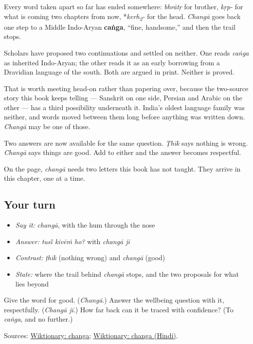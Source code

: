 \begin{cousinweb}
Every word taken apart so far has ended somewhere: \emph{bhrātṛ} for brother, \emph{kṛp-} for what is coming two chapters from now, *\emph{kerh\textsubscript{2}-} for the head. \emph{Changā} goes back one step to a Middle Indo-Aryan \textbf{caṅga}, \textquotedblleft{}fine, handsome,\textquotedblright{} and then the trail stops.

Scholars have proposed two continuations and settled on neither. One reads \emph{caṅga} as inherited Indo-Aryan; the other reads it as an early borrowing from a Dravidian language of the south. Both are argued in print. Neither is proved.

That is worth meeting head-on rather than papering over, because the two-source story this book keeps telling — Sanskrit on one side, Persian and Arabic on the other — has a third possibility underneath it. India's oldest language family was neither, and words moved between them long before anything was written down. \emph{Changā} may be one of those.

Two answers are now available for the same question. \emph{Ṭhīk} says nothing is wrong. \emph{Changā} says things are good. Add \textbf{} to either and the answer becomes respectful.

On the page, \emph{changā} needs two letters this book has not taught. They arrive in this chapter, one at a time.
\end{cousinweb}

\subsection*{Your turn}
\begin{itemize}
\raggedright
  \item \emph{Say it:} \emph{changā}, with the hum through the nose
  \item \emph{Answer:} \emph{tusī̃ kivēṁ ho?} with \emph{changā jī}
  \item \emph{Contrast:} \emph{ṭhīk} (nothing wrong) and \emph{changā} (good)
  \item \emph{State:} where the trail behind \emph{changā} stops, and the two proposals for what lies beyond
\end{itemize}

\begin{tcolorbox}[breakable,colback=teal!4,colframe=teal!35!black,title={Before you move on}]
Give the word for good. (\emph{Changā}.) Answer the wellbeing question with it, respectfully. (\emph{Changā jī}.) How far back can it be traced with confidence? (To \emph{caṅga}, and no further.)

Sources: \href{https://en.wiktionary.org/wiki/\%E0\%A8\%9A\%E0\%A9\%B0\%E0\%A8\%97\%E0\%A8\%BE}{Wiktionary: changa}; \href{https://en.wiktionary.org/wiki/\%E0\%A4\%9A\%E0\%A4\%82\%E0\%A4\%97\%E0\%A4\%BE}{Wiktionary: changa (Hindi)}.
\end{tcolorbox}
